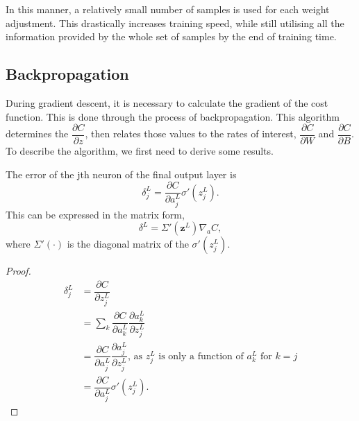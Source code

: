 In this manner, a relatively small number of samples is used for each weight adjustment. This drastically increases training speed, while still utilising all the information provided by the whole set of samples by the end of training time.

%
%
%


\subsection{Backpropagation}\label{nnets-backprop}

During gradient descent, it is necessary to calculate the gradient of the cost function. This is done through the process of backpropagation. This algorithm determines the $\dfrac{\partial C}{\partial z}$, then relates those values to the rates of interest, $\dfrac{\partial C}{\partial W}$ and $\dfrac{\partial C}{\partial B}$. To describe the algorithm, we first need to derive some results.


\begin{proposition}
	The error of the jth neuron of the final output layer is
	\[
		\delta_j^L = \dfrac{\partial C}{\partial a_j^L}\sigma'(z_j^L).
	\]
	This can be expressed in the matrix form,
	\[
		\delta^L = \Sigma'(\mathbf{z}^L)\nabla_aC,
	\]
where $\Sigma'(\cdot)$ is the diagonal matrix of the $\sigma'(z_j^L)$.
\end{proposition}

\begin{proof}
	\begin{align*}
		\delta_j^L & = \dfrac{\partial C}{\partial z_j^L} \\
		& = \sum_k\dfrac{\partial C}{\partial a_k^L}\dfrac{\partial a_k^L}{\partial z_j^L} \\
		& = \dfrac{\partial C}{\partial a_j^L}\dfrac{\partial a_j^L}{\partial z_j^L}\text{, as }z_j^L\text{ is only a function of }a_k^L\text{ for }k = j \\
		& = \dfrac{\partial C}{\partial a_j^L}\sigma'(z_j^L).
	\end{align*}
\end{proof}

